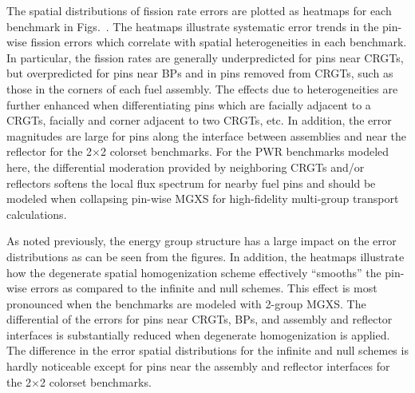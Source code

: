 The spatial distributions of fission rate errors are plotted as heatmaps for each benchmark in Figs.~. The heatmaps illustrate systematic  error trends in the pin-wise fission errors which correlate with spatial heterogeneities in each benchmark. In particular, the fission rates are generally underpredicted for pins near \acp{CRGT}, but overpredicted for pins near \acp{BP} and in pins removed from \acp{CRGT}, such as those in the corners of each fuel assembly. The effects due to heterogeneities are further enhanced when differentiating pins which are facially adjacent to a \acp{CRGT}, facially and corner adjacent to two \acp{CRGT}, etc. In addition, the error magnitudes are large for pins along the interface between assemblies and near the reflector for the 2$\times$2 colorset benchmarks. For the \ac{PWR} benchmarks modeled here, the differential moderation provided by neighboring \acp{CRGT} and/or reflectors softens the local flux spectrum for nearby fuel pins and should be modeled when collapsing pin-wise \ac{MGXS} for high-fidelity multi-group transport calculations.

As noted previously, the energy group structure has a large impact on the error distributions as can be seen from the figures. In addition, the heatmaps illustrate how the degenerate spatial homogenization scheme effectively ``smooths'' the pin-wise errors as compared to the infinite and null schemes. This effect is most pronounced when the benchmarks are modeled with 2-group \ac{MGXS}. The differential of the errors for pins near \acp{CRGT}, \acp{BP}, and assembly and reflector interfaces is substantially reduced when degenerate homogenization is applied. The difference in the error spatial distributions for the infinite and null schemes is hardly noticeable except for pins near the assembly and reflector interfaces for the 2$\times$2 colorset benchmarks.

